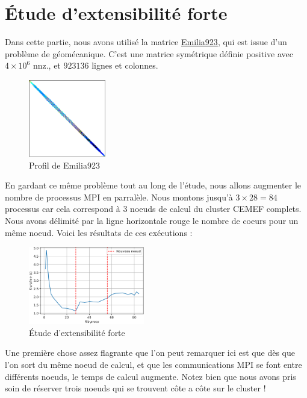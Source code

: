 \documentclass[10pt,twocolumn,letterpaper]{article}
\begin{document}
\section{Étude d'extensibilité forte}

Dans cette partie, nous avons utilisé la matrice
\href{https://sparse.tamu.edu/Janna/Emilia_923}{Emilia923}, qui est issue d'un
problème de géomécanique. C'est une matrice symétrique définie positive avec 
$4\times 10^6$ nnz., et $923136$ lignes et colonnes.

\begin{figure}[H]
  \centering
  \caption{Profil de Emilia923}
  \includegraphics[width=0.3\textwidth]{fig/Emilia923.png}
\end{figure}

En gardant ce même problème tout au long de l'étude, nous allons augmenter 
le nombre de processus MPI en parralèle. Nous montons jusqu'à $3 \times 28 = 84$
processus car cela correspond à $3$ noeuds de calcul du cluster CEMEF complets.
Nous avons délimité par la ligne horizontale rouge le nombre de coeurs pour un
même noeud.
Voici les résultats de ces exécutions :

\begin{figure}[H]
    \centering
    \caption{Étude d'extensibilité forte}
    \includegraphics[width=0.45\textwidth]{fig/strong_scalab.png}
  \end{figure}

Une première chose assez flagrante que l'on peut remarquer ici est que dès que
l'on sort du même noeud de calcul, et que les communications MPI se font entre 
différents noeuds, le temps de calcul augmente.
Notez bien que nous avons pris soin de
réserver trois noeuds qui se trouvent côte a côte sur le cluster !
\end{document}
